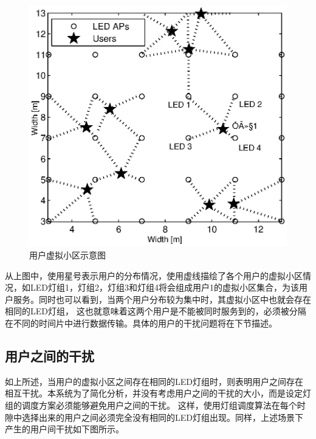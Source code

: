 \begin{figure}[htbp]
    \centering
	\includegraphics[width=\textwidth]{figures/chapter-5/UserInterference.eps}
	\caption{用户虚拟小区示意图}
	\label{fig:user-interference}
\end{figure}

从上图中，使用星号表示用户的分布情况，使用虚线描绘了各个用户的虚拟小区情况，如LED灯组1，灯组2，灯组3和灯组4将会组成用户1的虚拟小区集合，为该用户服务。同时也可以看到，当两个用户分布较为集中时，其虚拟小区中也就会存在相同的LED灯组，
这也就意味着这两个用户是不能被同时服务到的，必须被分隔在不同的时间片中进行数据传输。具体的用户的干扰问题将在下节描述。

\subsection{用户之间的干扰}
如上所述，当用户的虚拟小区之间存在相同的LED灯组时，则表明用户之间存在相互干扰。本系统为了简化分析，并没有考虑用户之间的干扰的大小，而是设定灯组的调度方案必须能够避免用户之间的干扰。
这样，使用灯组调度算法在每个时隙中选择出来的用户之间必须完全没有相同的LED灯组出现。同样，上述场景下产生的用户间干扰如下图所示。


